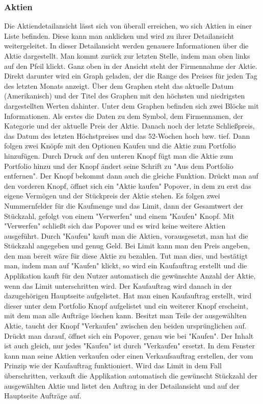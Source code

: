 \documentclass[10pt]{scrartcl}
\begin{document}
\subsubsection{Aktien}
Die Aktiendetailansicht lässt sich von überall erreichen, wo sich Aktien in einer Liste befinden. Diese kann man anklicken und wird zu ihrer Detailansicht weitergeleitet. In dieser Detailansicht werden genauere Informationen über die Aktie dargestellt. Man kommt zurück zur letzten Stelle, indem man oben links auf den Pfeil klickt.
Ganz oben in der Ansicht steht der Firmennahme der Aktie. Direkt darunter wird ein Graph geladen, der die Range des Preises für jeden Tag des letzten Monats anzeigt. Über dem Graphen steht das aktuelle Datum (Amerikanisch) und der Titel des Graphen mit den höchsten und niedrigsten dargestellten Werten dahinter. 
Unter dem Graphen befinden sich zwei Blöcke mit Informationen. Als erstes die Daten zu dem Symbol, dem Firmennamen, der Kategorie und der aktuelle Preis der Aktie. Danach noch der letzte Schließpreis, das Datum des letzten Höchstpreises und das 52-Wochen hoch bzw. tief.
Dann folgen zwei Knöpfe mit den Optionen Kaufen und die Aktie zum Portfolio hinzufügen.
Durch Druck auf den unteren Knopf fügt man die Aktie zum Portfolio hinzu und der Knopf ändert seine Schrift zu "Aus dem Portfolio entfernen". Der Knopf bekommt dann auch die gleiche Funktion.
Drückt man auf den vorderen Knopf, öffnet sich ein "Aktie kaufen" Popover, in dem zu erst das eigene Vermögen und der Stückpreis der Aktie stehen. Es folgen zwei Nummernfelder für die Kaufmenge und das Limit, dann der Gesamtwert der Stückzahl, gefolgt von einem "Verwerfen" und einem "Kaufen" Knopf. Mit "Verwerfen" schließt sich das Popover und es wird keine weitere Aktien ausgeführt. Durch "Kaufen" kauft man die Aktien, vorausgesetzt, man hat die Stückzahl angegeben und genug Geld. Bei Limit kann man den Preis angeben, den man bereit wäre für diese Aktie zu bezahlen. Tut man dies, und bestätigt man, indem man auf "Kaufen" klickt, so wird ein Kaufauftrag erstellt und die Applikation kauft für den Nutzer automatisch die gewünschte Anzahl der Aktie, wenn das Limit unterschritten wird. Der Kaufauftrag wird danach in der dazugehörigen Hauptseite aufgelistet. Hat man einen Kaufauftrag erstellt, wird dieser unter dem Portfolio Knopf aufgelistet und ein weiterer Knopf erscheint, mit dem man alle Aufträge löschen kann.
Besitzt man Teile der ausgewählten Aktie, taucht der Knopf "Verkaufen" zwischen den beiden ursprünglichen auf. Drückt man darauf, öffnet sich ein Popover, genau wie bei "Kaufen". Der Inhalt ist auch gleich, nur jedes "Kaufen" ist durch "Verkaufen" ersetzt. In dem Fenster kann man seine Aktien verkaufen oder einen Verkaufsauftrag erstellen, der vom Prinzip wie der Kaufauftrag funktioniert. Wird das Limit in dem Fall überschritten, verkauft die Applikation automatisch die gewünscht Stückzahl der ausgewählten Aktie und listet den Auftrag in der Detailansicht und auf der Hauptseite Aufträge auf.
\end{document}
